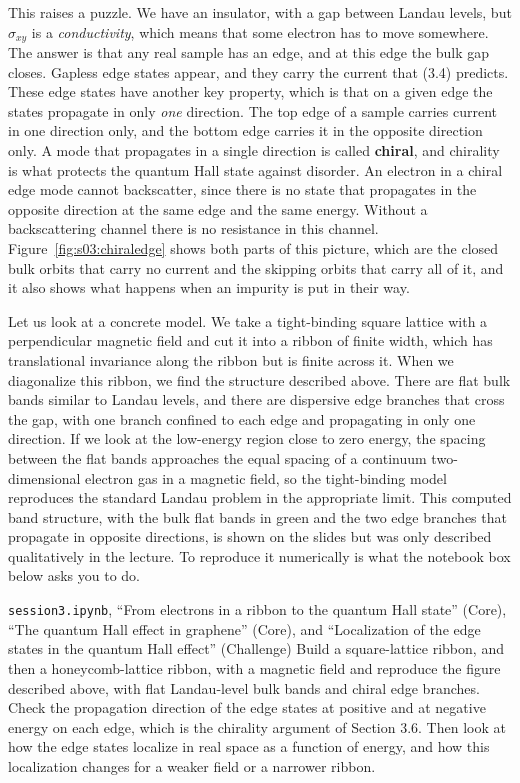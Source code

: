 This raises a puzzle. We have an insulator, with a gap between Landau levels, but $\sigma_{xy}$ is a
\emph{conductivity}, which means that some electron has to move somewhere. The answer is that any real
sample has an edge, and at this edge the bulk gap closes. Gapless edge states appear, and they carry
the current that (3.4) predicts. These edge states have another key property, which is that on a
given edge the states propagate in only \emph{one} direction. The top edge of a sample carries current
in one direction only, and the bottom edge carries it in the opposite direction only. A mode that
propagates in a single direction is called \textbf{chiral}, and chirality is what protects the quantum
Hall state against disorder. An electron in a chiral edge mode cannot backscatter, since there is no
state that propagates in the opposite direction at the same edge and the same energy. Without a
backscattering channel there is no resistance in this channel. Figure~\ref{fig:s03:chiraledge} shows
both parts of this picture, which are the closed bulk orbits that carry no current and the skipping
orbits that carry all of it, and it also shows what happens when an impurity is put in their way.



Let us look at a concrete model. We take a tight-binding square lattice with a perpendicular magnetic
field and cut it into a ribbon of finite width, which has translational invariance along the ribbon
but is finite across it. When we diagonalize this ribbon, we find the structure described above.
There are flat bulk bands similar to Landau levels, and there are dispersive edge branches that cross
the gap, with one branch confined to each edge and propagating in only one direction. If we look at
the low-energy region close to zero energy, the spacing between the flat bands approaches the equal
spacing of a continuum two-dimensional electron gas in a magnetic field, so the tight-binding model
reproduces the standard Landau problem in the appropriate limit. This computed band structure, with
the bulk flat bands in green and the two edge branches that propagate in opposite directions, is
shown on the slides but was only described qualitatively in the lecture. To reproduce it numerically
is what the notebook box below asks you to do.

\begin{notebookbox}{\texttt{session3.ipynb}, ``From electrons in a ribbon to the quantum Hall state'' (Core), ``The quantum Hall effect in graphene'' (Core), and ``Localization of the edge states in the quantum Hall effect'' (Challenge)}
Build a square-lattice ribbon, and then a honeycomb-lattice ribbon, with a magnetic field and
reproduce the figure described above, with flat Landau-level bulk bands and chiral edge branches.
Check the propagation direction of the edge states at positive and at negative energy on each edge,
which is the chirality argument of Section 3.6. Then look at how the edge states localize in real
space as a function of energy, and how this localization changes for a weaker field or a narrower
ribbon.
\end{notebookbox}

